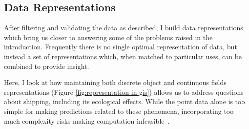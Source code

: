\documentclass[12pt,letterpaper]{article}
\begin{document}


\subsection{Data Representations}


After filtering and validating the data as described, I build data representations which bring us closer to answering some of the problems raised in the introduction. Frequently there is no single optimal representation of data, but instead a set of representations which, when matched to particular uses, can be combined to provide insight.

Here, I look at how maintaining both discrete object and continuous fields representations (Figure \ref{fig:representation-in-gis}) allows us to address questions about shipping, including its ecological effects. While the point data alone is too simple for making predictions related to these phenomena, incorporating too much complexity risks making computation infeasible~\citep{de2007geospatial}.



\end{document}
